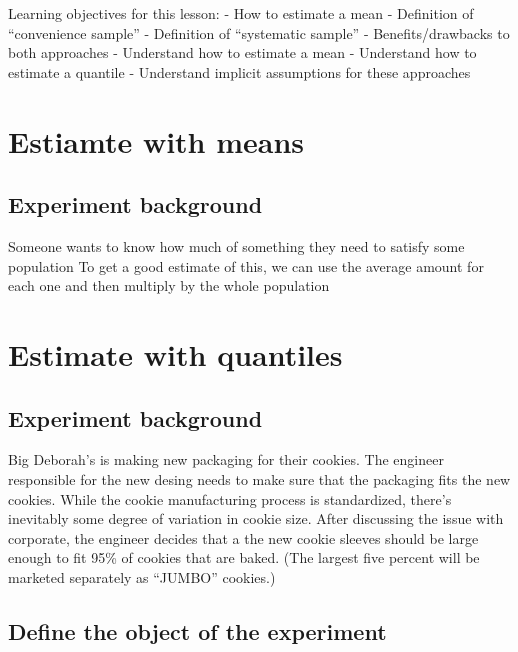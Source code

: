 \documentclass[
]{book}
\theoremstyle{definition}
\theoremstyle{definition}
\theoremstyle{definition}
\theoremstyle{remark}
\begin{document}
Learning objectives for this lesson:
- How to estimate a mean
- Definition of ``convenience sample''
- Definition of ``systematic sample''
- Benefits/drawbacks to both approaches
- Understand how to estimate a mean
- Understand how to estimate a quantile
- Understand implicit assumptions for these approaches

\hypertarget{estiamte-with-means}{%
\section{Estiamte with means}\label{estiamte-with-means}}

\hypertarget{experiment-background-2}{%
\subsection{Experiment background}\label{experiment-background-2}}

Someone wants to know how much of something they need to satisfy some population
To get a good estimate of this, we can use the average amount for each one and then multiply by the whole population

\hypertarget{estimate-with-quantiles}{%
\section{Estimate with quantiles}\label{estimate-with-quantiles}}

\hypertarget{experiment-background-3}{%
\subsection{Experiment background}\label{experiment-background-3}}

Big Deborah's is making new packaging for their cookies. The engineer responsible for the new desing needs to make sure that the packaging fits the new cookies. While the cookie manufacturing process is standardized, there's inevitably some degree of variation in cookie size. After discussing the issue with corporate, the engineer decides that a the new cookie sleeves should be large enough to fit 95\% of cookies that are baked. (The largest five percent will be marketed separately as ``JUMBO'' cookies.)

\hypertarget{define-the-object-of-the-experiment}{%
\subsection{Define the object of the experiment}\label{define-the-object-of-the-experiment}}
\end{document}
